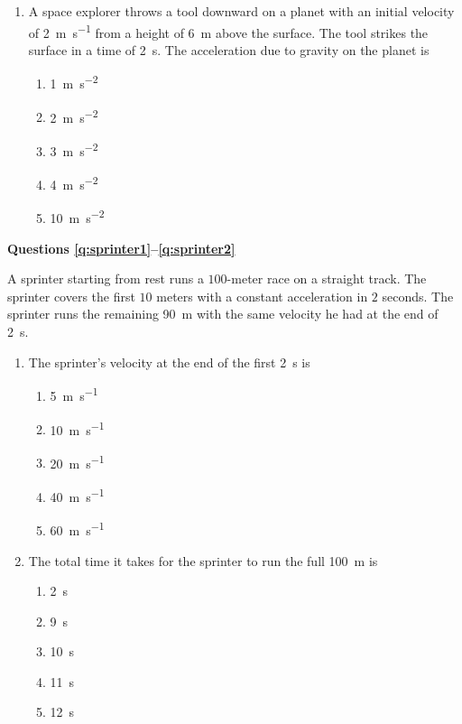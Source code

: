 \documentclass{../../../oss-apphys}
\begin{document}
\begin{multicols}{2}
\begin{enumerate}[leftmargin=18pt]
  \item A space explorer throws a tool downward on a planet with an initial
    velocity of \SI{2}{\metre\per\second} from a height of \SI{6}{\metre}
    above the surface. The
    tool strikes the surface in a time of \SI{2}{\second}. The acceleration due
    to gravity on the planet is
    \begin{enumerate}[nosep,leftmargin=18pt,label=(\Alph*)]
    \item\SI{1}{\metre\per\second\squared}
    \item\SI{2}{\metre\per\second\squared}
    \item\SI{3}{\metre\per\second\squared}
    \item\SI{4}{\metre\per\second\squared}
    \item\SI{10}{\metre\per\second\squared}
    \end{enumerate}
  \end{enumerate}
  \columnbreak

  \textbf{Questions \ref{q:sprinter1}--\ref{q:sprinter2}}
  
  A sprinter starting from rest runs a $100$-meter race on a straight track. The
  sprinter covers the first $10$ meters with a constant acceleration in $2$
  seconds. The sprinter runs the remaining \SI{90}{\metre} with the same
  velocity he had at the end of \SI{2}{\second}.

  \begin{enumerate}[resume,leftmargin=18pt]
  \item The sprinter's velocity at the end of the first \SI{2}{\second} is
    \begin{enumerate}[nosep,leftmargin=18pt,label=(\Alph*)]
    \item\SI{5 }{\metre\per\second}
    \item\SI{10}{\metre\per\second}
    \item\SI{20}{\metre\per\second}
    \item\SI{40}{\metre\per\second}
    \item\SI{60}{\metre\per\second}
    \end{enumerate}
    \label{q:sprinter1}

  \item The total time it takes for the sprinter to run the full
    \SI{100}{\metre} is
    \begin{enumerate}[nosep,leftmargin=18pt,label=(\Alph*)]
    \item\SI{2 }{\second}
    \item\SI{9 }{\second}
    \item\SI{10}{\second}
    \item\SI{11}{\second}
    \item\SI{12}{\second}
    \end{enumerate}
    \label{q:sprinter2}
    

\end{enumerate}
\end{multicols}
\end{document}
